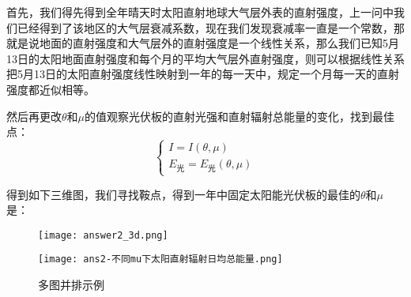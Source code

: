 \documentclass[withoutpreface,bwprint]{cumcmthesis} %
\begin{document}
首先，我们得先得到全年晴天时太阳直射地球大气层外表的直射强度，上一问中我们已经得到了该地区的大气层衰减系数，现在我们发现衰减率一直是一个常数，那就是说地面的直射强度和大气层外的直射强度是一个线性关系，那么我们已知5月13日的太阳地面直射强度和每个月的平均大气层外直射强度，则可以根据线性关系把5月13日的太阳直射强度线性映射到一年的每一天中，规定一个月每一天的直射强度都近似相等。

然后再更改$\theta$和$\mu$的值观察光伏板的直射光强和直射辐射总能量的变化，找到最佳点：
\begin{equation}
	\begin{cases}
		I = I(\theta,\mu) \\
		E_{\mbox{光}} = E_{\mbox{光}}(\theta, \mu)
	\end{cases}
	\label{eq:003}
\end{equation}

得到如下三维图，我们寻找鞍点，得到一年中固定太阳能光伏板的最佳的$\theta$和$\mu$是：

\begin{figure}
	\centering
	\begin{minipage}[c]{0.48\textwidth}
		\centering
		\texttt{[image: answer2\_3d.png]}
	\end{minipage}
	\begin{minipage}[c]{0.48\textwidth}
		\centering
		\texttt{[image: ans2-不同mu下太阳直射辐射日均总能量.png]}
	\end{minipage}
	\caption{多图并排示例}
\end{figure}
\newpage
\end{document}
